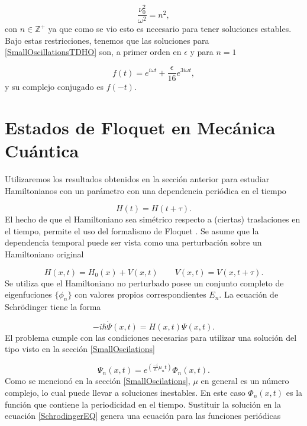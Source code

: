 \documentclass[10pt,a4paper]{report}
\begin{document}
\begin{equation}
\frac{\nu_0^2}{\omega^2} = n^2,\label{scattering}
\end{equation} con $n \in \mathbb{Z}^+$ ya que como se vio esto es necesario para tener soluciones estables\cite{WardFT}. Bajo estas restricciones, tenemos que las soluciones para \eqref{SmallOscillationsTDHO} son, a primer orden en $\epsilon$ y para $n=1$

\begin{equation}\label{SmallOscillationsSolution}
f(t)=  e^{i\omega t} + \frac{\epsilon}{16} e^{3i\omega t},
\end{equation} y su complejo conjugado es $f(-t)$.


\section{Estados de Floquet en Mecánica Cuántica}

Utilizaremos los resultados obtenidos en la
  sección anterior para estudiar Hamiltonianos con un parámetro con
  una dependencia periódica en el tiempo

\begin{equation} \label{TimeH}
H(t)=H(t+\tau).
\end{equation} El hecho de que el Hamiltoniano sea simétrico respecto a (ciertas) traslaciones en el tiempo, permite el uso del formalismo de Floquet \cite{HanngiDQS}. Se asume que la dependencia temporal puede ser vista como una perturbación sobre un Hamiltoniano original

\begin{equation}
H(x,t)=H_0(x)+V(x,t) \qquad V(x,t)=V(x,t+\tau).
\end{equation}
Se utiliza que el Hamiltoniano no perturbado posee un conjunto
completo de eigenfuciones $\{\phi_n\}$ con valores propios
correspondientes $E_n$.   La
ecuación de Schr\"{o}dinger tiene la forma

\begin{equation}\label{SchrodingerEQ}
-i\hbar\dot{\Psi}(x,t) = H(x,t)\Psi(x,t).
\end{equation} El problema cumple con las condiciones necesarias para utilizar una solución del tipo visto en la sección \ref{SmallOscilations}

\begin{equation}
\Psi_n(x,t) = e^{(\frac{-i}{\hbar}\mu_nt)}\Phi_n(x,t).
\end{equation} Como se mencionó en la sección \ref{SmallOscilations}, $\mu$ en general es un número complejo, lo cual puede llevar a soluciones inestables. En este caso $\Phi_n(x,t)$ es la función que contiene la periodicidad en el tiempo. Sustituir la solución en la ecuación \eqref{SchrodingerEQ} genera una ecuación para las funciones periódicas
\end{document}
